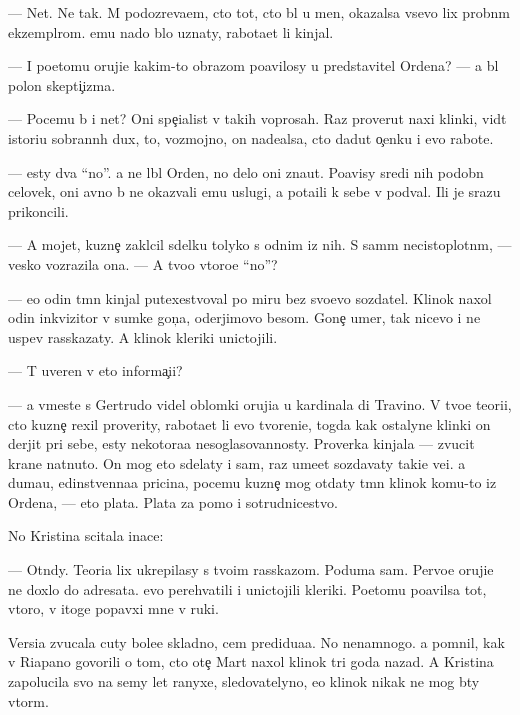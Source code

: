 \documentclass[10pt]{book}
\begin{document}
— Net. Ne tak. M{\yi} podozreva{\y}em, cto tot, cto b{\yi}l u men{\ia}, okazalsa vsevo lix probn{\yi}m ekzempl{\ia}rom. {\Y}emu nado b{\yi}lo uznaty, rabota{\y}et li kinjal.

— I poetomu oruji{\y}e kakim-to obrazom po{\y}avilosy u predstavitel{\ia} Ordena? — {\Y}a b{\yi}l polon skepti{\c}izma.

— Po\-ce\-mu b{\yi} i net? Oni spe{\c}ialist{\yi} v takih voprosah. Raz prover{\ia}{\y}ut naxi klinki, vid{\ia}t istori{\y}u sobrann{\yi}h dux, to, vozmojno, on nade{\y}alsa, cto dadut o{\c}enku i {\y}evo rabote.

— {\Y}esty dva ``no''. {\Y}a ne l{\io}bl{\io} Orden, no delo oni zna{\y}ut. Po{\y}avisy sredi nih podobn{\yi}{\y} celovek, oni {\y}avno b{\yi} ne okaz{\yi}vali {\y}emu uslugi, a pota{\x}ili k sebe v podval{\yi}. Ili je srazu prikoncili.

— A mojet, kuzne{\c} zakl{\io}cil sdelku tolyko s odnim iz nih. S sam{\yi}m ne\-cisto\-plot\-n{\yi}m, — vesko vozrazila ona. — A tvo{\y}o vtoro{\y}e ``no''?

— {\Y}e{\x}o odin t{\e}mn{\yi}{\y} kinjal putexestvoval po miru bez svo{\y}evo sozdatel{\ia}. Klinok naxol odin inkvizitor v sumke gon{\c}a, oderjimovo besom. Gone{\c} umer, tak nicevo i ne uspev rasskazaty. A klinok kleriki unictojili.

— T{\yi} uveren v eto{\y} informa{\c}i{\y}i?

— {\Y}a vmeste s Gertrudo{\y} videl oblomki oruji{\y}a u kardinala di Travino. V tvo{\y}e{\y} teori{\y}i, cto kuzne{\c} rexil proverity, rabota{\y}et li {\y}evo tvoreni{\y}e, togda kak ostalyn{\yi}{\y}e klinki on derjit pri sebe, {\y}esty nekotora{\y}a nesoglasovannosty. Proverka kinjala — zvucit kra{\y}ne nat{\ia}nuto. On mog eto sdelaty i sam, raz ume{\y}et sozdavaty taki{\y}e ve{\x}i. {\Y}a duma{\y}u, {\y}edinstvenna{\y}a pricina, pocemu kuzne{\c} mog otdaty t{\e}mn{\yi}{\y} klinok komu-to iz Ordena, — eto plata. Plata za pomo{\x} i sotrudnicestvo.

No Kristina scitala inace:

— Otn{\io}dy. Teori{\y}a lix ukrepilasy s tvo{\y}im rasskazom. Poduma{\y} sam. Pervo{\y}e oruji{\y}e ne doxlo do adresata. {\Y}evo perehvatili i unictojili kleriki. Poetomu po{\y}avilsa tot, vtoro{\y}, v itoge popavxi{\y} mne v ruki.

Versi{\y}a zvucala cuty bole{\y}e skladno, cem predidu{\x}a{\y}a. No nenamnogo. {\Y}a pomnil, kak v Riapano govorili o tom, cto ote{\c} Mart naxol klinok tri goda nazad. A Kristina zapolucila svo{\y} na semy let ranyxe, sledovatelyno, {\y}e{\y}o klinok nikak ne mog b{\yi}ty vtor{\yi}m.
\end{document}
